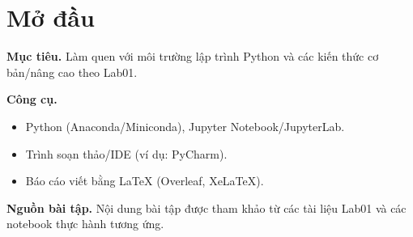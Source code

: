 \chapter*{Mở đầu}

\textbf{Mục tiêu.} Làm quen với môi trường lập trình Python và các kiến thức cơ bản/nâng cao theo Lab01.

\textbf{Công cụ.}
\begin{itemize}
  \item Python (Anaconda/Miniconda), Jupyter Notebook/JupyterLab.
  \item Trình soạn thảo/IDE (ví dụ: PyCharm).
  \item Báo cáo viết bằng LaTeX (Overleaf, XeLaTeX).
\end{itemize}

\textbf{Nguồn bài tập.} Nội dung bài tập được tham khảo từ các tài liệu Lab01 và các notebook thực hành tương ứng.

\clearpage

